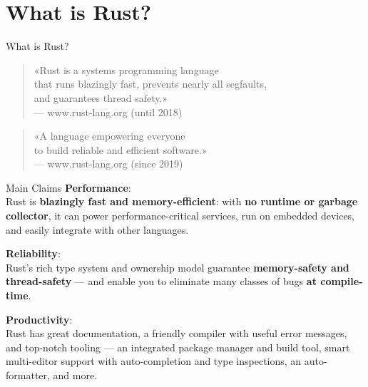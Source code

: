 \section{What is Rust?}


\begin{frame}[c]{What is Rust?}
	\begin{quote}
		«Rust is a systems programming language\\
		that runs blazingly fast, prevents nearly all segfaults,\\
		and guarantees thread safety.»\\
		\vspace{0.5em}
		{\normalfont \small --- www.rust-lang.org (until 2018)}
	\end{quote}

	\vspace{2em}

	\begin{quote}
		«A language empowering everyone\\
		to build reliable and efficient software.»\\
		\vspace{0.5em}
		{\normalfont \small --- www.rust-lang.org (since 2019)}
	\end{quote}
\end{frame}


\begin{frame}{Main Claims}
	\textbf{Performance}:\\Rust is \textbf{blazingly fast and memory-efficient}:
	with \textbf{no runtime or garbage collector}, it can power
	performance-critical services, run on embedded devices, and easily integrate
	with other languages.

	\pause

	\textbf{Reliability}:\\Rust's rich type system and ownership model guarantee
	\textbf{memory-safety and thread-safety} — and enable you to eliminate many
	classes of bugs \textbf{at compile-time}.

	\pause

	\textbf{Productivity}:\\Rust has great documentation, a friendly compiler with
	useful error messages, and top-notch tooling — an integrated package manager
	and build tool, smart multi-editor support with auto-completion and type
	inspections, an auto-formatter, and more.
\end{frame}

